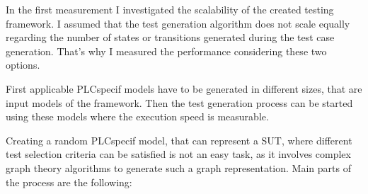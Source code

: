 In the first measurement I investigated the scalability of the created testing framework. I assumed that the test generation algorithm does not scale equally regarding the number of states or transitions generated during the test case generation. That's why I measured the performance considering these two options.

First applicable PLCspecif models have to be generated in different sizes, that are input models of the framework. Then the test generation process can be started using these models where the execution speed is measurable.

Creating a random PLCspecif model, that can represent a SUT, where different test selection criteria can be satisfied is not an easy task, as it involves complex graph theory algorithms to generate such a graph representation. Main parts of the process are the following:

